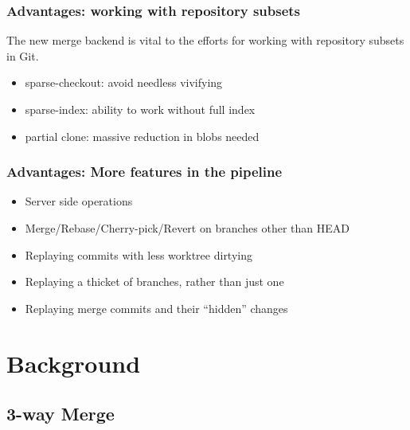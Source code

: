 \documentclass[compress,t]{beamer}
\begin{document}

\begin{frame}
  \frametitle{Advantages: working with repository subsets}

  The new merge backend is vital to the efforts for working with
  repository subsets in Git.
  \begin{itemize}
    \item sparse-checkout: avoid needless vivifying
    \item sparse-index: ability to work without full index
    \item partial clone: massive reduction in blobs needed
  \end{itemize}

\end{frame}


\begin{frame}
  \frametitle{Advantages: More features in the pipeline}

  \begin{itemize}
    \item Server side operations
    \item Merge/Rebase/Cherry-pick/Revert on branches other than HEAD
    \item Replaying commits with less worktree dirtying
    \item Replaying a thicket of branches, rather than just one
    \item Replaying merge commits and their ``hidden'' changes
  \end{itemize}

\end{frame}

\section{Background}
\subsection{3-way Merge}
\end{document}

